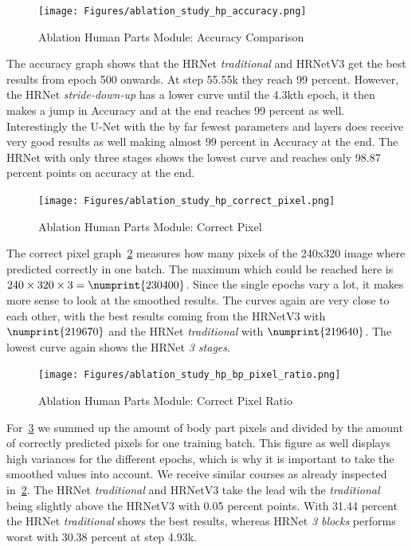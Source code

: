 \begin{figure}[H]
    \centering
    \texttt{[image: Figures/ablation\_study\_hp\_accuracy.png]}
    \decoRule
    \caption[Ablation Human Parts Module: Accuracy]{Ablation Human Parts Module: Accuracy Comparison}
    \label{fig:ablation-accuracy}
\end{figure}

The accuracy graph shows that the HRNet \textit{traditional} and HRNetV3 get the best results from epoch 500 onwards.
At step 55.55k they reach 99 percent.
However, the HRNet \textit{stride-down-up} has a lower curve until the 4.3kth epoch, it then makes a jump in Accuracy
and at the end reaches 99 percent as well.
Interestingly the U-Net with the by far fewest parameters and layers does receive very good results as well making almost
99 percent in Accuracy at the end.
The HRNet with only three stages shows the lowest curve and reaches only 98.87 percent points on accuracy at the end.

\begin{figure}[H]
    \centering
    \texttt{[image: Figures/ablation\_study\_hp\_correct\_pixel.png]}
    \decoRule
    \caption[Ablation Human Parts Module: Correct Pixel]{Ablation Human Parts Module: Correct Pixel}
    \label{fig:ablation-correct-px}
\end{figure}

The correct pixel graph~\ref{fig:ablation-correct-px} measures how many pixels of the 240x320 image where predicted correctly
in one batch. The maximum which could be reached here is $240\times320\times3=\numprint{230400}$.
Since the single epochs vary a lot, it makes more sense to look at the smoothed results.
The curves again are very close to each other, with the best results coming from the HRNetV3 with $\numprint{219670}$ and
the HRNet \textit{traditional} with $\numprint{219640}$.
The lowest curve again shows the HRNet \textit{3 stages}.

\begin{figure}[H]
    \centering
    \texttt{[image: Figures/ablation\_study\_hp\_bp\_pixel\_ratio.png]}
    \decoRule
    \caption[Ablation Human Parts Module: Correctness Ratio]{Ablation Human Parts Module: Correct Pixel Ratio}
    \label{fig:correct-pixel-ratio}
\end{figure}

For~\ref{fig:correct-pixel-ratio} we summed up the amount of body part pixels and divided by the amount of correctly
predicted pixels for one training batch.
This figure as well displays high variances for the different epochs, which is why it is important to take the smoothed
values into account. We receive similar courses as already inspected in~\ref{fig:ablation-correct-px}.
The HRNet \textit{traditional} and HRNetV3 take the lead wih the \textit{traditional} being slightly above the HRNetV3
with 0.05 percent points. With 31.44 percent the HRNet \textit{traditional} shows the best results, whereas HRNet
\textit{3 blocks} performs worst with 30.38 percent at step 4.93k.

